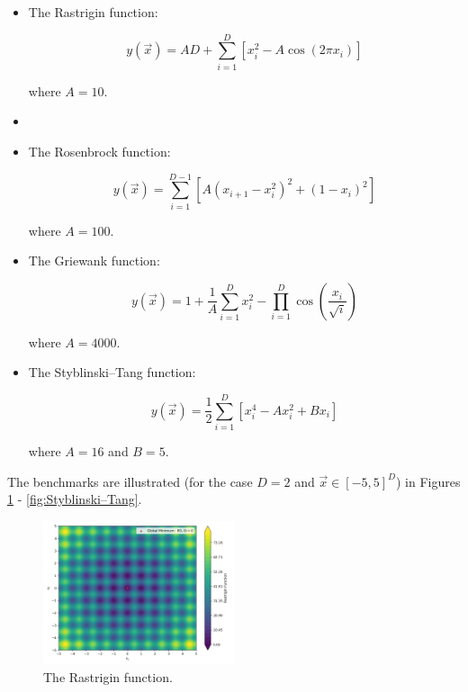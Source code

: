 \documentclass[conference]{IEEEtran}
\begin{document}
\begin{itemize}
	\item The Rastrigin function:
	
	\begin{equation}
		y(\vec{x}) = AD + \sum_{i=1}^{D}\left[x_i^2 - A\cos(2\pi x_i)\right]
		\label{eqn:Rastrigin}
	\end{equation}
	
	\noindent where $A = 10$.

	\item []
	\item The Rosenbrock function:
	
	\begin{equation}
		y(\vec{x}) = \sum_{i=1}^{D - 1}\left[A(x_{i + 1} - x_i^2)^2 + (1 - x_i)^2\right]
		\label{eqn:Rosenbrock}
	\end{equation}
	
	\noindent where $A = 100$.
	
	\item The Griewank function:
	
	\begin{equation}
		y(\vec{x}) = 1 + \frac{1}{A}\sum_{i=1}^{D}x_i^2 - \prod_{i=1}^{D}\cos\left(\frac{x_i}{\sqrt{i}}\right)
		\label{eqn:Griewank}
	\end{equation}
	
	\noindent where $A = 4000$.
	
	\item The Styblinski–Tang function:
	
	\begin{equation}
		y(\vec{x}) = \frac{1}{2}\sum_{i=1}^{D}\left[x_i^4 - Ax_i^2 + Bx_i\right]
		\label{eqn:Styblinski–Tang}
	\end{equation}
	
	\noindent where $A = 16$ and $B = 5$.
\end{itemize}

The benchmarks are illustrated (for the case $D = 2$ and $\vec{x} \in [-5, 5]^D$) in Figures \ref{fig:Rastrigin} - \ref{fig:Styblinski–Tang}.

\begin{figure}[htbp]
	\centerline{\includegraphics[width=0.5\textwidth]{benchmarks/test_Rastrigin.png}}
	\caption{The Rastrigin function.}
	\label{fig:Rastrigin}
\end{figure}
\end{document}
